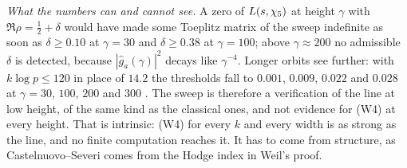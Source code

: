 \emph{What the numbers can and cannot see.}  A zero of $L(s,\chi_5)$ at height $\gamma$ with
$\Re\rho=\tfrac12+\delta$ would have made some Toeplitz matrix of the sweep indefinite as soon as
$\delta\ge0.10$ at $\gamma=30$ and $\delta\ge0.38$ at $\gamma=100$; above $\gamma\approx200$ no admissible
$\delta$ is detected, because $|\hat g_a(\gamma)|^2$ decays like $\gamma^{-4}$.  Longer orbits see
further: with $k\log p\le120$ in place of $14.2$ the thresholds fall to $0.001$, $0.009$, $0.022$
and $0.028$ at $\gamma=30$, $100$, $200$ and $300$ .  The sweep is therefore a verification of the line at low height, of the same kind
as the classical ones, and not evidence for (W4) at every height.  That is intrinsic: (W4) for
every $k$ and every width is as strong as the line, and no finite computation reaches it.  It has
to come from structure, as Castelnuovo--Severi comes from the Hodge index in Weil's proof.

